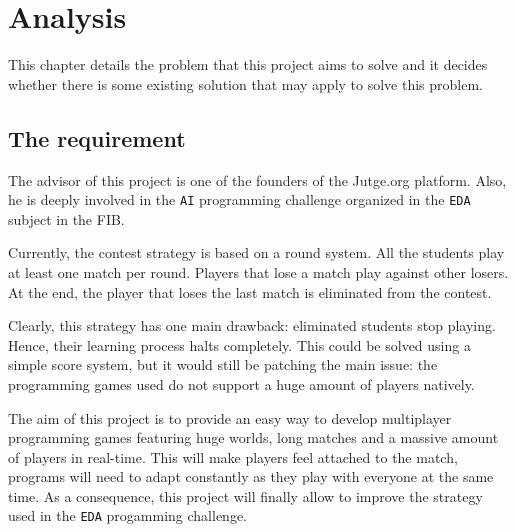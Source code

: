 \documentclass[a4paper,11pt,titlepage,abstract,numbers=noenddot,automark,mnsy,intlimits,rgb,dvipsnames]{report}
\begin{document}
\chapter{Analysis}
This chapter details the problem that this project aims to solve and it decides whether there is some existing
solution that may apply to solve this problem.
\section{The requirement}
\label{requirement}
The advisor of this project is one of the founders of the Jutge.org platform. Also, he is deeply involved in the \texttt{AI}
programming challenge organized in the \texttt{EDA} subject in the FIB.

Currently, the contest strategy is based on a round system. All the students play at least one match per round. Players
that lose a match play against other losers. At the end, the player that loses the last match is eliminated from the contest.

Clearly, this strategy has one main drawback: eliminated students stop playing. Hence, their learning process halts completely.
This could be solved using a simple score system, but it would still be patching the main issue: the
programming games used do not support a huge amount of players natively.

The aim of this project is to provide an easy way to develop multiplayer programming games featuring huge worlds,
long matches and a massive amount of players in real-time. This will make players feel attached to the match,
programs will need to adapt constantly as they play with everyone at the same time. As a consequence, this project will
finally allow to improve the strategy used in the \texttt{EDA} progamming challenge.
\end{document}
